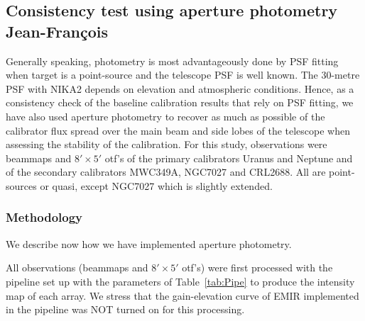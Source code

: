
%



\subsection{Consistency test using aperture photometry {\color{blue} Jean-Fran\c cois}}
\label{se:aperture_photometry}

Generally speaking, photometry is most advantageously done by PSF fitting when target is a point-source
and the telescope PSF is well known. The 30-metre PSF with NIKA2 depends on elevation and atmospheric conditions.
Hence, as a consistency check of the baseline calibration results that rely on PSF fitting, we have also used aperture photometry to recover as much as possible of the calibrator flux spread over the main beam and side
lobes of the telescope when assessing the stability of the calibration. 
For this study, observations were beammaps and $8' \times 5'$ otf's of the primary calibrators Uranus and Neptune
and of the secondary calibrators MWC349A, NGC7027 and CRL2688. All are
point-sources or quasi, except NGC7027 which is slightly extended.


\subsubsection{Methodology}
We describe now how we have implemented aperture photometry.

All observations (beammaps and $8' \times 5'$ otf's) were first processed 
with the pipeline set up with the parameters of Table~\ref{tab:Pipe} to produce the intensity map of each array.
We stress that the  gain-elevation curve of EMIR implemented in the pipeline was NOT  turned on for this processing.

